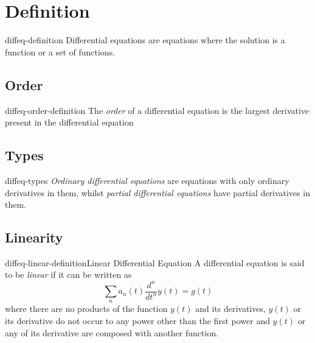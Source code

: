 \documentclass[preview]{standalone}
\begin{document}
\genpage

\section{Definition}

\begin{snippet}{diffeq-definition}
Differential equations are equations where the solution is a function
or a set of functions.
\end{snippet}

\subsection{Order}

\begin{snippet}{diffeq-order-definition}
The \textit{order} of a differential equation is the largest derivative present in the
differential equation
\end{snippet}

\subsection{Types}

\begin{snippet}{diffeq-types}
\textit{Ordinary differential equations} are equations with only
ordinary derivatives in them, whilst \textit{partial differential equations}
have partial derivatives in them.
\end{snippet}

\subsection{Linearity}

\begin{snippetdefinition}{diffeq-linear-definition}{Linear Differential Equation}
    A differential equation is said to be \textit{linear} if it can be written as
    \[
        \sum_n a_n(t) \frac{d^n}{dt^n}y(t)=g(t)
    \]
    where there are no products of the function \(y(t)\) and its derivatives,
    \(y(t)\) or its derivative do not occur to any power other than the first power
    and \(y(t)\) or any of its derivative are composed with another function.
\end{snippetdefinition}
\end{document}
